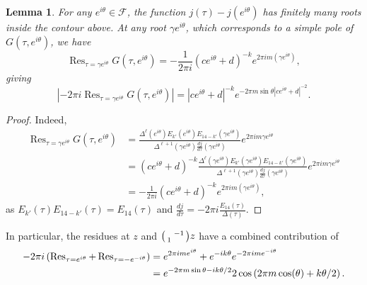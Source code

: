 \documentclass[12pt]{amsart}
\theoremstyle{plain} %
\newtheorem{lemma}      [theorem]{Lemma}
\theoremstyle{definition}
\theoremstyle{remark}
\numberwithin{equation}{section}
\newenvironment{spmatrix}{\left(\begin{smallmatrix}}{\end{smallmatrix}\right)}
\newcommand{\SL}{\operatorname{SL}}
\newcommand{\Res}{\operatorname{Res}}
\renewcommand{\Re}{\operatorname{Re}}
\renewcommand{\Im}{\operatorname{Im}}
\begin{document}

\begin{lemma}\label{l:poles}
For any $e^{i\theta}\in \mathcal{F}$, the function $j(\tau)-j(e^{i\theta})$ has finitely many roots inside the contour above. At any root $\gamma e^{i\theta}$, which corresponds to a simple pole of $G(\tau,e^{i\theta})$, we have
\[\Res_{\tau = \gamma
  e^{i\theta}}G(\tau,e^{i\theta})=-\frac{1}{2\pi i} (ce^{i\theta}+d)^{-k}
e^{2\pi i m (\gamma e^{i\theta})},\]
giving
\[|-2\pi i\Res_{\tau = \gamma
  e^{i\theta}}G(\tau,e^{i\theta})|=|ce^{i\theta}+d|^{-k}
e^{-2\pi  m \sin\theta|ce^{i\theta}+d|^{-2}}.\]
\end{lemma}
\begin{proof}
Indeed,
\begin{align*}
\Res_{\tau = \gamma
  e^{i\theta}}G(\tau,e^{i\theta})&=\frac{\Delta^\ell(e^{i\theta})E_{k'}(e^{i\theta})E_{14-k'}(\gamma e^{i\theta})}{\Delta^{\ell+1}(\gamma e^{i\theta})\frac{dj}{d\tau}(\gamma e^{i\theta})}e^{2\pi
                                   i m \gamma e^{i\theta}}\\
  &=(c e^{i\theta}+d)^{-k}\frac{\Delta^\ell(\gamma e^{i\theta})E_{k'}(\gamma e^{i\theta})E_{14-k'}(\gamma e^{i\theta})}{\Delta^{\ell+1}(\gamma e^{i\theta})\frac{dj}{d\tau}(\gamma e^{i\theta})}e^{2\pi
    i m \gamma e^{i\theta}}\\
  &=-\frac{1}{2\pi i} (ce^{i\theta}+d)^{-k}
e^{2\pi i m (\gamma e^{i\theta})},
\end{align*}
as $E_{k'}(\tau)E_{14-k'}(\tau)=E_{14}(\tau)$ and $\frac{dj}{d\tau}=-2\pi i \frac{E_{14}(\tau)}{\Delta(\tau)}$.
\end{proof}

In particular, the residues at $z$ and $\begin{spmatrix}
&-1\\1&\end{spmatrix}z$ have a combined contribution of
\begin{align*}
-2\pi i \left(\Res_{\tau=e^{i\theta}}+\Res_{\tau=-e^{-i\theta}}\right) &= e^{2\pi i m e^{i\theta}}+ e^{-ik\theta}e^{-2\pi i m e^{-i\theta}} \notag \\
&=e^{-2\pi m\sin\theta-ik\theta/2} 2\cos\left(2\pi m\cos (\theta)+k\theta/2\right).
\end{align*}
\end{document}

